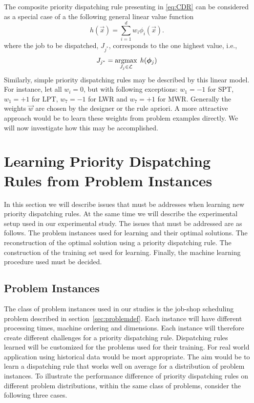 \documentclass[smallextended]{svjour3}
\renewcommand{\vphi}{\bm{\phi}}
\begin{document}
The composite priority dispatching rule presenting in \eqref{eq:CDR} can be considered as a special case of a the following general linear value function
\begin{equation}\label{eq:jssp:linweights}
	h(\vec{x})=\sum_{i=1}^d w_i\phi_i(\vec{x}).
\end{equation}
where the job to be dispatched, 
$J_{j^*}$, corresponds to the one highest value, i.e.,
\begin{equation}\label{eq:lin}
	J_{j^*}=\argmax_{J_j\in \mathcal{L}}\; h(\vphi_j)
\end{equation}
Similarly, simple priority dispatching rules may be described by this linear model. For instance, let all $w_i=0$, but with following exceptions: $w_1=-1$ for SPT, $w_1=+1$ for LPT, $w_7=-1$ for LWR and $w_7=+1$ for MWR. Generally the weights $\vec{w}$ are chosen by the designer or the 
rule apriori.  A more attractive approach would be to learn these weights from 
problem examples directly. We will now investigate how this may be accomplished.


\section{Learning Priority Dispatching Rules from Problem Instances}\label{sec:gentrainingdata}

In this section we will describe issues that must be addresses when learning new priority dispatching rules. At the same time we will describe the experimental setup used in our experimental study. The issues that must be addressed are as follows. The problem instances used for learning and their optimal solutions. The reconstruction of the optimal solution using a priority dispatching rule. The construction of the training set used for learning. Finally, the
machine learning procedure used must be decided.


\subsection*{Problem Instances}\label{sec:data:sim}

The class of problem instances used in our studies is the job-shop scheduling problem described in section~\ref{sec:problemdef}. Each instance will have different processing times, machine ordering and dimensions. Each instance will therefore create different challenges for a priority dispatching rule. Dispatching rules learned will be customized for the problems used for their training. For real world application using historical data would be most appropriate. The aim would be to learn a dispatching rule that works well on average for a distribution of problem instances. To illustrate the performance difference of priority dispatching rules on different problem distributions, within the same class of problems, consider the following three cases.
\end{document}
